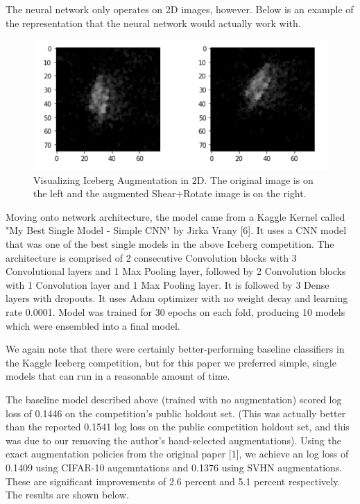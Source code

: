 \documentclass[10pt,twocolumn,letterpaper]{article}
\begin{document}
The neural network only operates on 2D images, however.  Below is an example of the representation that the neural network would actually work with.

\begin{figure}[bhp]
\includegraphics[width=\columnwidth]{iceberg_aug_2d_example.png}
\caption{Visualizing Iceberg Augmentation in 2D.  The original image is on the left and the augmented Shear+Rotate image is on the right.}
\end{figure}

Moving onto network architecture, the model came from a Kaggle Kernel called "My Best Single Model - Simple CNN" by Jirka Vrany [6].  It uses a CNN model that was one of the best single models in the above Iceberg competition. The architecture is comprised of 2 consecutive Convolution blocks with 3 Convolutional layers and 1 Max Pooling layer, followed by 2 Convolution blocks with 1 Convolution layer and 1 Max Pooling layer. It is followed by 3 Dense layers with dropouts. It uses Adam optimizer with no weight decay and learning rate 0.0001. Model was trained for 30 epochs on each fold, producing 10 models which were ensembled into a final model.  

We again note that there were certainly better-performing baseline classifiers in the Kaggle Iceberg competition, but for this paper we preferred simple, single models that can run in a reasonable amount of time. 

The baseline model described above (trained with no augmentation) scored log loss of 0.1446 on the competition's public holdout set. (This was actually better than the reported 0.1541 log loss on the public competition holdout set, and this was due to our removing the author's hand-selected augmentations).  Using the exact augmentation policies from the original paper [1], we achieve an log loss of 0.1409 using CIFAR-10 augemntations and 0.1376 using SVHN augmentations.  These are significant improvements of 2.6 percent and 5.1 percent respectively.  The results are shown below.
\end{document}
